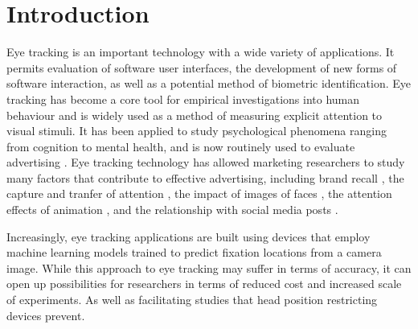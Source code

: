 \documentclass[sigconf]{acmart}
\numberwithin{equation}{section}
\begin{document}


\maketitle

\section{Introduction}

Eye tracking is an important technology with a wide variety of applications. 
It permits evaluation of software user interfaces\cite{Harezlak2015}, 
the development of new forms of software interaction, as well as a potential method of biometric identification\cite{Kasprowski2018}. Eye tracking has become a core tool for empirical 
investigations into human behaviour and is widely used as a method of measuring explicit 
attention to visual stimuli. 
It has been applied to study psychological phenomena ranging from cognition\cite{Brunye2019}
to mental health\cite{Duque2014,Rudich-Strassler2022}, and is now routinely used to evaluate 
advertising \cite{Hervet2011}. Eye tracking technology has allowed marketing researchers 
to study many factors that contribute to effective advertising, 
including brand recall \cite{Wedel2000},
the capture and tranfer of attention \cite{Pieters2004}, 
the impact of images of faces \cite{Djamasbi2010},
the attention effects of animation \cite{Hamborg2012},
and the relationship with social media posts \cite{Barreto2013}.

Increasingly, eye tracking applications are built using devices that employ 
machine learning models trained to predict fixation locations from a camera image.
While this approach to eye tracking may suffer in terms of accuracy, it can
open up possibilities for researchers in terms of reduced cost and increased scale
of experiments. As well as facilitating studies that head position restricting 
devices prevent\cite{Valtakari2021}.
\end{document}
